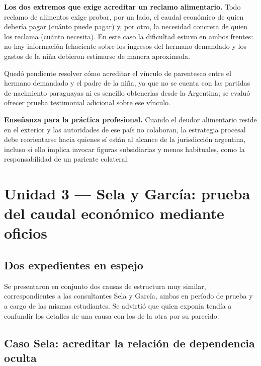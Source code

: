 \documentclass[12pt,oneside]{book}
\begin{document}
\begin{important}
\textbf{Los dos extremos que exige acreditar un reclamo alimentario.} Todo reclamo de alimentos exige probar, por un lado, el caudal económico de quien debería pagar (cuánto puede pagar) y, por otro, la necesidad concreta de quien los reclama (cuánto necesita). En este caso la dificultad estuvo en ambos frentes: no hay información fehaciente sobre los ingresos del hermano demandado y los gastos de la niña debieron estimarse de manera aproximada.
\end{important}

Quedó pendiente resolver cómo acreditar el vínculo de parentesco entre el hermano demandado y el padre de la niña, ya que no se cuenta con las partidas de nacimiento paraguayas ni es sencillo obtenerlas desde la Argentina; se evaluó ofrecer prueba testimonial adicional sobre ese vínculo.

\begin{note}
\textbf{Enseñanza para la práctica profesional.} Cuando el deudor alimentario reside en el exterior y las autoridades de ese país no colaboran, la estrategia procesal debe reorientarse hacia quienes sí están al alcance de la jurisdicción argentina, incluso si ello implica invocar figuras subsidiarias y menos habituales, como la responsabilidad de un pariente colateral.
\end{note}

\section{Unidad 3 --- Sela y García: prueba del caudal económico mediante oficios}

\subsection{Dos expedientes en espejo}

Se presentaron en conjunto dos causas de estructura muy similar, correspondientes a las consultantes Sela y García, ambas en período de prueba y a cargo de las mismas estudiantes. Se advirtió que quien exponía tendía a confundir los detalles de una causa con los de la otra por su parecido.

\subsection{Caso Sela: acreditar la relación de dependencia oculta}
\end{document}
